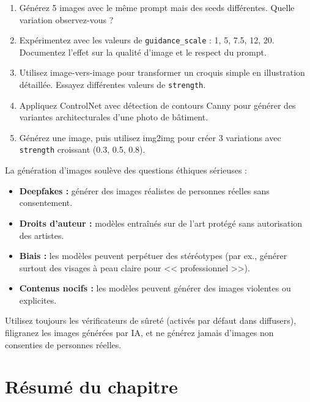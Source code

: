 \begin{exercise}
\begin{enumerate}
  \item G\'en\'erez 5 images avec le m\^eme prompt mais des seeds diff\'erentes. Quelle variation observez-vous ?
  \item Exp\'erimentez avec les valeurs de \texttt{guidance\_scale} : 1, 5, 7.5, 12, 20. Documentez l'effet sur la qualit\'e d'image et le respect du prompt.
  \item Utilisez image-vers-image pour transformer un croquis simple en illustration d\'etaill\'ee. Essayez diff\'erentes valeurs de \texttt{strength}.
  \item Appliquez ControlNet avec d\'etection de contours Canny pour g\'en\'erer des variantes architecturales d'une photo de b\^atiment.
  \item G\'en\'erez une image, puis utilisez img2img pour cr\'eer 3 variations avec \texttt{strength} croissant (0.3, 0.5, 0.8).
\end{enumerate}
\end{exercise}

\begin{ethicsbox}
La g\'en\'eration d'images soul\`eve des questions \'ethiques s\'erieuses :
\begin{itemize}
  \item \textbf{Deepfakes :} g\'en\'erer des images r\'ealistes de personnes r\'eelles sans consentement.
  \item \textbf{Droits d'auteur :} mod\`eles entra\^in\'es sur de l'art prot\'eg\'e sans autorisation des artistes.
  \item \textbf{Biais :} les mod\`eles peuvent perp\'etuer des st\'er\'eotypes (par ex., g\'en\'erer surtout des visages \`a peau claire pour << professionnel >>).
  \item \textbf{Contenus nocifs :} les mod\`eles peuvent g\'en\'erer des images violentes ou explicites.
\end{itemize}
Utilisez toujours les v\'erificateurs de s\^uret\'e (activ\'es par d\'efaut dans diffusers), filigranez les images g\'en\'er\'ees par IA, et ne g\'en\'erez jamais d'images non consenties de personnes r\'eelles.
\end{ethicsbox}

\section{R\'esum\'e du chapitre}

